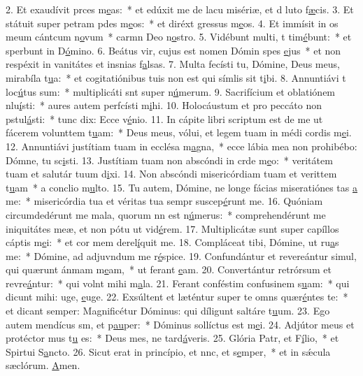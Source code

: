 2. Et exaudívit prces m\uline{e}as:~* et edúxit me de lacu misériæ, et d luto f\uline{æ}cis.
3. Et státuit super petram pdes m\uline{e}os:~* et diréxt gressus m\uline{e}os.
4. Et immísit in os meum cántcum n\uline{o}vum~* carmn Deo n\uline{o}stro.
5. Vidébunt multi, t tim\uline{é}bunt:~* et sperbunt in D\uline{ó}mino.
6. Beátus vir, cujus est nomen Dómin spes \uline{e}jus~* et non respéxit in vanitátes et insnias f\uline{a}lsas.
7. Multa fecísti tu, Dómine, Deus meus, mirabíla t\uline{u}a:~* et cogitatiónibus tuis non est qui símlis sit t\uline{i}bi.
8. Annuntiávi t loc\uline{ú}tus sum:~* multiplicáti snt super n\uline{ú}merum.
9. Sacrifícium et oblatiónem nlu\uline{í}sti:~* aures autem perfcísti m\uline{i}hi.
10. Holocáustum et pro peccáto non pstul\uline{á}sti:~* tunc dix: Ecce v\uline{é}nio.
11. In cápite libri scriptum est de me ut fácerem volunttem t\uline{u}am:~* Deus meus, vólui, et legem tuam in médi cordis m\uline{e}i.
12. Annuntiávi justítiam tuam in ecclésa m\uline{a}gna,~* ecce lábia mea non prohibébo: Dómne, tu sc\uline{i}sti.
13. Justítiam tuam non abscóndi in crde m\uline{e}o:~* veritátem tuam et salutár tuum d\uline{i}xi.
14. Non abscóndi misericórdiam tuam et verittem t\uline{u}am~* a conclio m\uline{u}lto.
15. Tu autem, Dómine, ne longe fácias miseratiónes tas \uline{a} me:~* misericórdia tua et véritas tua sempr suscep\uline{é}runt me.
16. Quóniam circumdedérunt me mala, quorum nn est n\uline{ú}merus:~* comprehendérunt me iniquitátes meæ, et non pótu ut vid\uline{é}rem.
17. Multiplicátæ sunt super capíllos cáptis m\uline{e}i:~* et cor mem derel\uline{í}quit me.
18. Compláceat tibi, Dómine, ut ru\uline{a}s me:~* Dómine, ad adjuvndum me r\uline{é}spice.
19. Confundántur et revereántur simul, qui quærunt ánmam m\uline{e}am,~* ut ferant \uline{e}am.
20. Convertántur retrórsum et revre\uline{á}ntur:~* qui volnt mihi m\uline{a}la.
21. Ferant conféstim confusinem s\uline{u}am:~* qui dicunt mihi: uge, \uline{e}uge.
22. Exsúltent et læténtur super te omns quær\uline{é}ntes te:~* et dicant semper: Magnificétur Dóminus: qui díligunt saltáre t\uline{u}um.
23. Ego autem mendícus sm, et p\uline{au}per:~* Dóminus sollíctus est m\uline{e}i.
24. Adjútor meus et protéctor mus t\uline{u} es:~* Deus mes, ne tard\uline{á}veris.
25. Glória Patr, et F\uline{í}lio,~* et Spirtui S\uline{a}ncto.
26. Sicut erat in princípio, et nnc, et s\uline{e}mper,~* et in sǽcula sæclórum. \uline{A}men.
